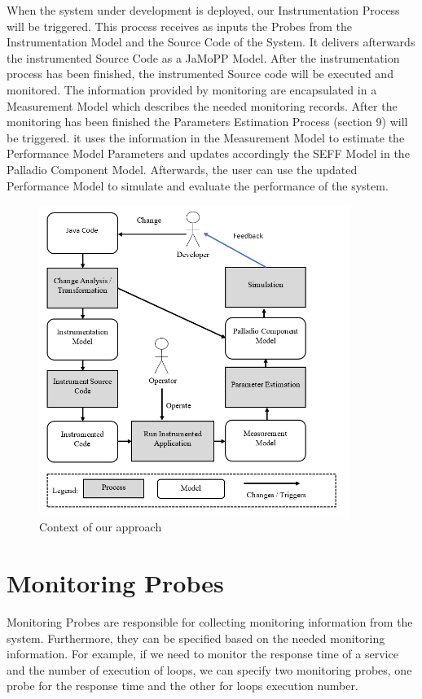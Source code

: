 When the system under development is deployed, our Instrumentation Process will be triggered. This process receives as inputs the Probes from the Instrumentation Model and the Source Code of the System. It delivers afterwards the instrumented Source Code as a JaMoPP Model. After the instrumentation process has been finished, the instrumented Source code will be executed and monitored.  The information provided by monitoring are encapsulated in a Measurement Model which describes the needed monitoring records.  After the monitoring has been finished the Parameters Estimation Process (section 9) will be triggered. it uses the information in the Measurement Model to estimate the Performance Model Parameters and updates accordingly the SEFF Model in the Palladio Component Model. Afterwards, the user can use the updated Performance Model to simulate and evaluate the performance of the system. \\


\begin{figure}[h]
\centering
\includegraphics[width=0.9\textwidth]{figures/approach_context}
\caption{Context of our approach}
\label{fig:Context of our approach}
\end{figure}


\section{Monitoring Probes}
\label{sec:Monitoring Probes}
Monitoring Probes are responsible for collecting monitoring information from the system. Furthermore, they can be specified based on the needed monitoring information. For example, if we need to monitor the response time of a service and the number of execution of loops, we can specify two monitoring probes, one probe for the response time and the other for loops execution number. \\

